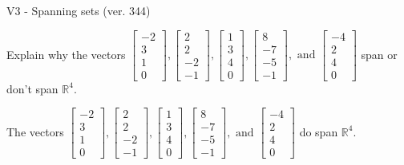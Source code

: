 \begin{exercise}
  \begin{exerciseTitle}V3 - Spanning sets (ver. 344)\end{exerciseTitle}
  \begin{exerciseStatement}
    Explain why the vectors \(\left[\begin{array}{r}
-2 \\
3 \\
1 \\
0
\end{array}\right] , \left[\begin{array}{r}
2 \\
2 \\
-2 \\
-1
\end{array}\right] , \left[\begin{array}{r}
1 \\
3 \\
4 \\
0
\end{array}\right] , \left[\begin{array}{r}
8 \\
-7 \\
-5 \\
-1
\end{array}\right] , \text{ and } \left[\begin{array}{r}
-4 \\
2 \\
4 \\
0
\end{array}\right]\) span or don't span \(\mathbb{R}^4\). 
	


  \end{exerciseStatement}
  \begin{exerciseAnswer}
   The vectors \(\left[\begin{array}{r}
-2 \\
3 \\
1 \\
0
\end{array}\right] , \left[\begin{array}{r}
2 \\
2 \\
-2 \\
-1
\end{array}\right] , \left[\begin{array}{r}
1 \\
3 \\
4 \\
0
\end{array}\right] , \left[\begin{array}{r}
8 \\
-7 \\
-5 \\
-1
\end{array}\right] , \text{ and } \left[\begin{array}{r}
-4 \\
2 \\
4 \\
0
\end{array}\right]\) 
  	 do  
	span \(\mathbb{R}^4\).
  


  \end{exerciseAnswer}
\end{exercise}